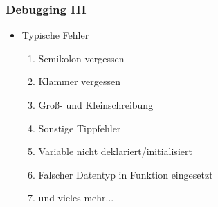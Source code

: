 \begin{frame}[fragile]
\frametitle{Debugging III}
\begin{itemize}
\item Typische Fehler
\begin{enumerate}
\item Semikolon vergessen
\item Klammer vergessen
\item Gro\ss- und Kleinschreibung
\item Sonstige Tippfehler
\item Variable nicht deklariert/initialisiert
\item Falscher Datentyp in Funktion eingesetzt
\item und vieles mehr...
\end{enumerate}
\end{itemize}
\end{frame}

